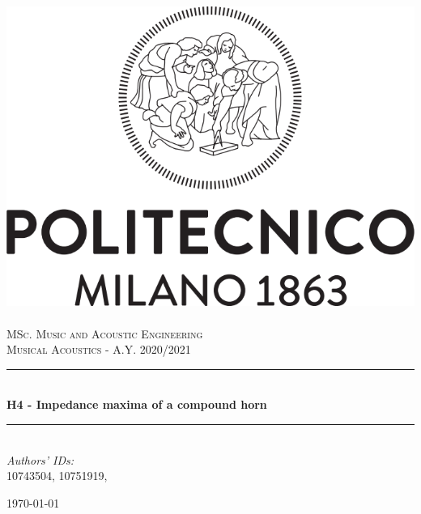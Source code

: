 \documentclass[a4paper]{article}
\title{}
\author{}
\begin{document}
\begin{titlepage}	
	\newcommand{\HRule}{\rule{\linewidth}{0.5mm}} %
	
	\center %
	
	
	\includegraphics[width=.4\textwidth]{Logo_Politecnico_Milano.png}\\[0.4cm]
	\textsc{\LARGE}\\[0.3cm] %
	
	\textsc{\large MSc. Music and Acoustic Engineering}\\[1cm] %
	
	\textsc{\Large Musical Acoustics - A.Y. 2020/2021}\\[0.5cm] %
	
	
	\HRule\\[0.4cm]
	
	{\huge\bfseries H4 - Impedance maxima of a compound horn }\\[0.4cm] %
	
	\HRule\\[1.5cm]
	
	
	
	{\large\textit{Authors' IDs:}}\\
	10743504, 10751919, %
	
	
	\vfill\vfill\vfill %
	
	{\large\today} %
	
	
	\vfill\vfill
	
	
	\vfill %
	
	
\end{titlepage}
\end{document}

